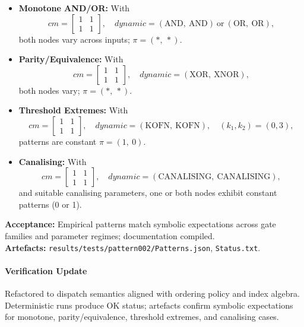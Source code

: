 \documentclass[11pt]{article}
\begin{document}
\begin{itemize}
\item \textbf{Monotone AND/OR:} With
\[
cm = \begin{bmatrix}1 & 1\\ 1 & 1\end{bmatrix},\quad dynamic=(\text{AND},\ \text{AND})\ \text{or}\ (\text{OR},\ \text{OR}),
\]
both nodes vary across inputs; \(\pi=(*,\ *)\).
\item \textbf{Parity/Equivalence:} With
\[
cm = \begin{bmatrix}1 & 1\\ 1 & 1\end{bmatrix},\quad dynamic=(\text{XOR},\ \text{XNOR}),
\]
both nodes vary; \(\pi=(*,\ *)\).
\item \textbf{Threshold Extremes:} With
\[
cm = \begin{bmatrix}1 & 1\\ 1 & 1\end{bmatrix},\quad dynamic=(\text{KOFN},\ \text{KOFN}),\quad (k_1, k_2)=(0,3),
\]
patterns are constant \(\pi=(1,\ 0)\).
\item \textbf{Canalising:} With
\[
cm = \begin{bmatrix}1 & 1\\ 1 & 1\end{bmatrix},\quad dynamic=(\text{CANALISING},\ \text{CANALISING}),
\]
and suitable canalising parameters, one or both nodes exhibit constant patterns (0 or 1).
\end{itemize}
\textbf{Acceptance:} Empirical patterns match symbolic expectations across gate families and parameter regimes; documentation compiled.\\
\textbf{Artefacts:} \texttt{results/tests/pattern002/Patterns.json}, \texttt{Status.txt}.\
\paragraph{Verification Update} Refactored to dispatch semantics aligned with ordering policy and index algebra. Deterministic runs produce OK status; artefacts confirm symbolic expectations for monotone, parity/equivalence, threshold extremes, and canalising cases.
\end{document}
